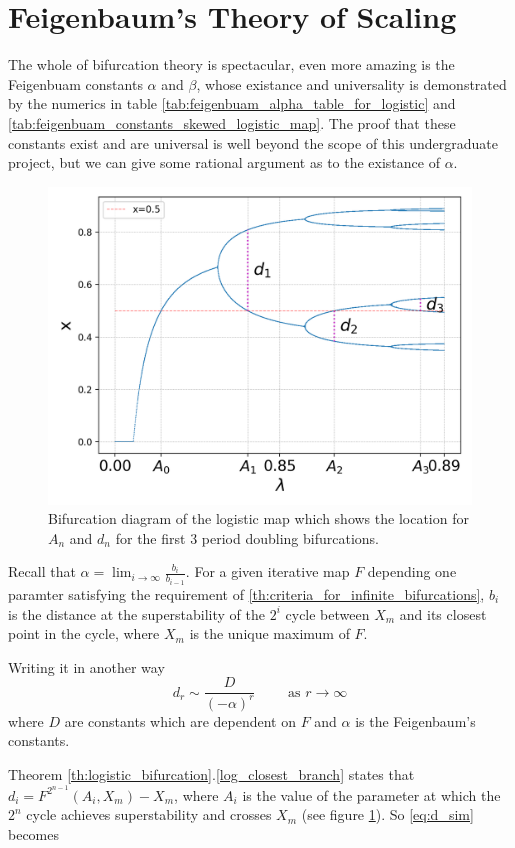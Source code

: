 \section{Feigenbaum's Theory of Scaling}

The whole of bifurcation theory is spectacular, even more amazing is the Feigenbuam constants $\alpha$ and $\beta$, whose existance and universality is demonstrated by the numerics in table \ref{tab:feigenbuam_alpha_table_for_logistic} and \ref{tab:feigenbuam_constants_skewed_logistic_map}.
The proof that these constants exist and are universal is well beyond the scope of this undergraduate project, but we can give some rational argument as to the existance of $\alpha$.

\begin{figure}
    \centering
    \includegraphics[width=0.6\linewidth]{Images/demonstration of feigenbaum constants.png}
    \caption{Bifurcation diagram of the logistic map which shows the location for $A_n$ and $d_n$ for the first 3 period doubling bifurcations.}
	\label{fig: universal raito}
\end{figure} 

Recall that $\alpha = \lim_{i \rightarrow  \infty}\frac{b_i}{b_{i-1}}$. 
For a given iterative map $F$ depending one paramter satisfying the requirement of \ref{th:criteria_for_infinite_bifurcations}, $b_i$ is the distance at the superstability of the $2^{i}$ cycle between $X_{m}$ and its closest point in the cycle, where $X_m$ is the unique maximum of $F$.

Writing it in another way
\begin{equation}\label{eq:d_sim}
d_r \sim\frac{D}{(-\alpha)^r} \quad \quad \text{ as } r \to \infty
\end{equation}
where $D$ are constants which are dependent on $F$ and $\alpha$ is the Feigenbaum's constants. 

Theorem \ref{th:logistic_bifurcation}.\ref{log_closest_branch} states that $d_i = F^{2^{n-1}}(A_i, X_m) - X_m$, where $A_i$ is the value of the parameter at which the $2^n$ cycle achieves superstability and crosses $X_m$ (see figure \ref{fig: universal raito}). 
So \eqref{eq:d_sim} becomes

